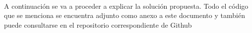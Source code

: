 \documentclass[../../memoria.tex]{subfiles}
\begin{document}
\paragraph{}
A continuación se va a proceder a explicar la solución propuesta. Todo el código que se menciona se encuentra adjunto como anexo a este documento y también puede consultarse en el repositorio correspondiente de Github \cite{repogithub}
\end{document}

